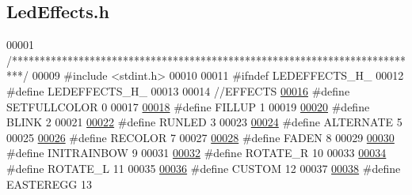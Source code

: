 \hypertarget{_led_effects_8h_source}{}\subsection{Led\+Effects.\+h}

\begin{DoxyCode}
00001 \textcolor{comment}{/**************************************************************************/}
00009 \textcolor{preprocessor}{#include <stdint.h>}
00010 
00011 \textcolor{preprocessor}{#ifndef LEDEFFECTS\_H\_}
00012 \textcolor{preprocessor}{#define LEDEFFECTS\_H\_}
00013 
00014 \textcolor{comment}{//EFFECTS}
\hypertarget{_led_effects_8h_source_l00016}{}\hyperlink{_led_effects_8h_a996334f1d53296a931624800377d5b01}{00016} \textcolor{comment}{}\textcolor{preprocessor}{#define SETFULLCOLOR 0  }
00017 
\hypertarget{_led_effects_8h_source_l00018}{}\hyperlink{_led_effects_8h_a2f349ea8f5412514d90f138ede08da62}{00018} \textcolor{preprocessor}{#define FILLUP 1}
00019 
\hypertarget{_led_effects_8h_source_l00020}{}\hyperlink{_led_effects_8h_a38eec52a7dccb94ff563e30eda32c891}{00020} \textcolor{preprocessor}{#define BLINK 2 }
00021 
\hypertarget{_led_effects_8h_source_l00022}{}\hyperlink{_led_effects_8h_ab6e06c8b4c17edc65d75be641a0fc39b}{00022} \textcolor{preprocessor}{#define RUNLED 3    }
00023 
\hypertarget{_led_effects_8h_source_l00024}{}\hyperlink{_led_effects_8h_ac7190c598c8618207180d135c0650dac}{00024} \textcolor{preprocessor}{#define ALTERNATE 5 }
00025 
\hypertarget{_led_effects_8h_source_l00026}{}\hyperlink{_led_effects_8h_a6b71fe4d23960c3701fc935a3368a6cc}{00026} \textcolor{preprocessor}{#define RECOLOR 7   }
00027 
\hypertarget{_led_effects_8h_source_l00028}{}\hyperlink{_led_effects_8h_ac64e9d348f9ff60935a2275f477020dc}{00028} \textcolor{preprocessor}{#define FADEN 8     }
00029 
\hypertarget{_led_effects_8h_source_l00030}{}\hyperlink{_led_effects_8h_a2805176df86592658ae06a508a558720}{00030} \textcolor{preprocessor}{#define INITRAINBOW 9   }
00031 
\hypertarget{_led_effects_8h_source_l00032}{}\hyperlink{_led_effects_8h_a85bd242525add173bd67847b7acac00b}{00032} \textcolor{preprocessor}{#define ROTATE\_R 10     }
00033 
\hypertarget{_led_effects_8h_source_l00034}{}\hyperlink{_led_effects_8h_a4a0c329f45825186172aee0c62531423}{00034} \textcolor{preprocessor}{#define ROTATE\_L 11 }
00035 
\hypertarget{_led_effects_8h_source_l00036}{}\hyperlink{_led_effects_8h_a686dea444026cbf1236c24e7edb3a96d}{00036} \textcolor{preprocessor}{#define CUSTOM 12   }
00037 
\hypertarget{_led_effects_8h_source_l00038}{}\hyperlink{_led_effects_8h_a5645ec20d3cd39bfc1c9ad5ec99db2f2}{00038} \textcolor{preprocessor}{#define EASTEREGG 13        }

\end{DoxyCode}
